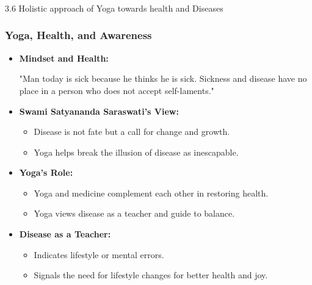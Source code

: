 \begin{frame}[fragile]\frametitle{}
\begin{center}
{\Large 3.6 Holistic approach of Yoga towards health and Diseases}
\end{center}
\end{frame}

\begin{frame}[fragile]\frametitle{Yoga, Health, and Awareness}

      \begin{itemize}
        \item \textbf{Mindset and Health:} 
        
        "Man today is sick because he thinks he is sick. Sickness and disease have no place in a person who does not accept self-laments." 
        
        \item \textbf{Swami Satyananda Saraswati's View:}
        \begin{itemize}
            \item Disease is not fate but a call for change and growth.
            \item Yoga helps break the illusion of disease as inescapable.
        \end{itemize}
        \item \textbf{Yoga's Role:}
        \begin{itemize}
            \item Yoga and medicine complement each other in restoring health.
            \item Yoga views disease as a teacher and guide to balance.
        \end{itemize}
        \item \textbf{Disease as a Teacher:}
        \begin{itemize}
            \item Indicates lifestyle or mental errors.
            \item Signals the need for lifestyle changes for better health and joy.
        \end{itemize}
      \end{itemize}

\end{frame}

